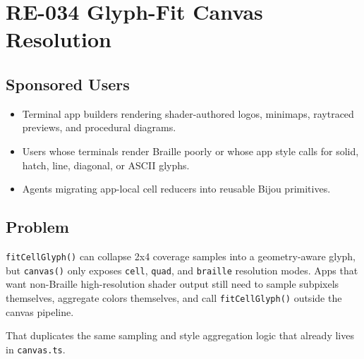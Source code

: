 \chapter{RE-034 Glyph-Fit Canvas Resolution}\label{record-162}

\smallskip

\section{Sponsored Users}\label{record-162-sponsored-users}

\begin{itemize}
\tightlist
\item
  Terminal app builders rendering shader-authored logos, minimaps, raytraced previews, and procedural diagrams.
\item
  Users whose terminals render Braille poorly or whose app style calls for solid, hatch, line, diagonal, or ASCII glyphs.
\item
  Agents migrating app-local cell reducers into reusable Bijou primitives.
\end{itemize}

\section{Problem}\label{record-162-problem}

\texttt{f\allowbreak{}i\allowbreak{}t\allowbreak{}C\allowbreak{}e\allowbreak{}l\allowbreak{}l\allowbreak{}G\allowbreak{}l\allowbreak{}y\allowbreak{}p\allowbreak{}h\allowbreak{}(\allowbreak{})} can collapse 2x4 coverage samples into a geometry-aware glyph, but \texttt{c\allowbreak{}a\allowbreak{}n\allowbreak{}v\allowbreak{}a\allowbreak{}s\allowbreak{}(\allowbreak{})} only exposes \texttt{c\allowbreak{}e\allowbreak{}l\allowbreak{}l}, \texttt{q\allowbreak{}u\allowbreak{}a\allowbreak{}d}, and \texttt{b\allowbreak{}r\allowbreak{}a\allowbreak{}i\allowbreak{}l\allowbreak{}l\allowbreak{}e} resolution modes. Apps that want non-Braille high-resolution shader output still need to sample subpixels themselves, aggregate colors themselves, and call \texttt{f\allowbreak{}i\allowbreak{}t\allowbreak{}C\allowbreak{}e\allowbreak{}l\allowbreak{}l\allowbreak{}G\allowbreak{}l\allowbreak{}y\allowbreak{}p\allowbreak{}h\allowbreak{}(\allowbreak{})} outside the canvas pipeline.

That duplicates the same sampling and style aggregation logic that already lives in \texttt{c\allowbreak{}a\allowbreak{}n\allowbreak{}v\allowbreak{}a\allowbreak{}s\allowbreak{}.\allowbreak{}t\allowbreak{}s}.

